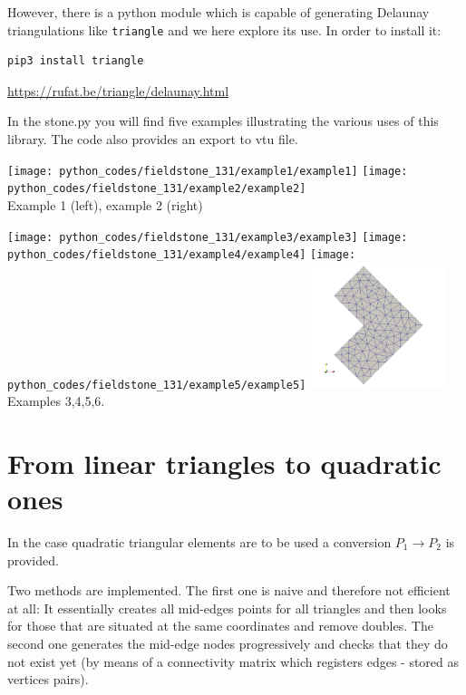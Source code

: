However, there is a python module which is capable of generating Delaunay triangulations like {\tt triangle}
and we here explore its use. In order to install it:
\begin{verbatim}
pip3 install triangle
\end{verbatim}

\url{https://rufat.be/triangle/delaunay.html}

In the {\python stone.py} you will find five examples illustrating the various 
uses of this library. The code also provides an export to vtu file. 


\begin{center}
\texttt{[image: python\_codes/fieldstone\_131/example1/example1]}
\texttt{[image: python\_codes/fieldstone\_131/example2/example2]}\\
{\captionfont Example 1 (left), example 2 (right)}
\end{center}


\begin{center}
\texttt{[image: python\_codes/fieldstone\_131/example3/example3]}
\texttt{[image: python\_codes/fieldstone\_131/example4/example4]}
\texttt{[image: python\_codes/fieldstone\_131/example5/example5]}
\includegraphics[width=4cm]{python_codes/fieldstone_131/example6/mesh}\\
{\captionfont Examples 3,4,5,6.}
\end{center}

\section*{From linear triangles to quadratic ones}

In the case quadratic triangular elements are to be used a conversion $P_1 \rightarrow P_2$
is provided.

Two methods are implemented. The first one is naive and therefore not efficient at all:
It essentially creates all mid-edges points for all triangles and then looks for those 
that are situated at the same coordinates and remove doubles. 
The second one generates the mid-edge nodes progressively and checks that they do not 
exist yet (by means of a connectivity matrix which registers edges - 
stored as vertices pairs).


